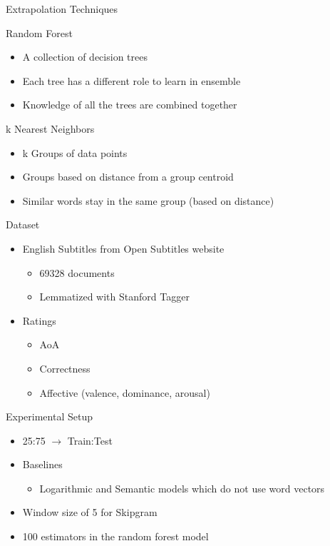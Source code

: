 \documentclass{beamer}
\begin{document}
\begin{frame}{Extrapolation Techniques}
\begin{block}{Random Forest}
    \begin{itemize}
        \item A collection of decision trees
        \item Each tree has a different role to learn in ensemble
        \item Knowledge of all the trees are combined together
    \end{itemize}
\end{block}

\begin{block}{k Nearest Neighbors}
    \begin{itemize}
        \item k Groups of data points
        \item Groups based on distance from a group centroid
        \item Similar words stay in the same group (based on distance)
    \end{itemize}
\end{block}
\end{frame}

\begin{frame}{Dataset}
    \begin{itemize}
        \item English Subtitles from Open Subtitles website
            \begin{itemize}
                \item 69328 documents
                \item Lemmatized with Stanford Tagger
            \end{itemize}
        \item Ratings
            \begin{itemize}
                \item AoA
                \item Correctness
                \item Affective (valence, dominance, arousal)
            \end{itemize}
    \end{itemize}
\end{frame}

\begin{frame}{Experimental Setup}
    \begin{itemize}
        \item 25:75 $\rightarrow$ Train:Test
        \item Baselines
            \begin{itemize}
                \item Logarithmic and Semantic models which do not use word vectors
            \end{itemize}
        \item Window size of 5 for Skipgram
        \item 100 estimators in the random forest model
    \end{itemize}
\end{frame}
\end{document}
